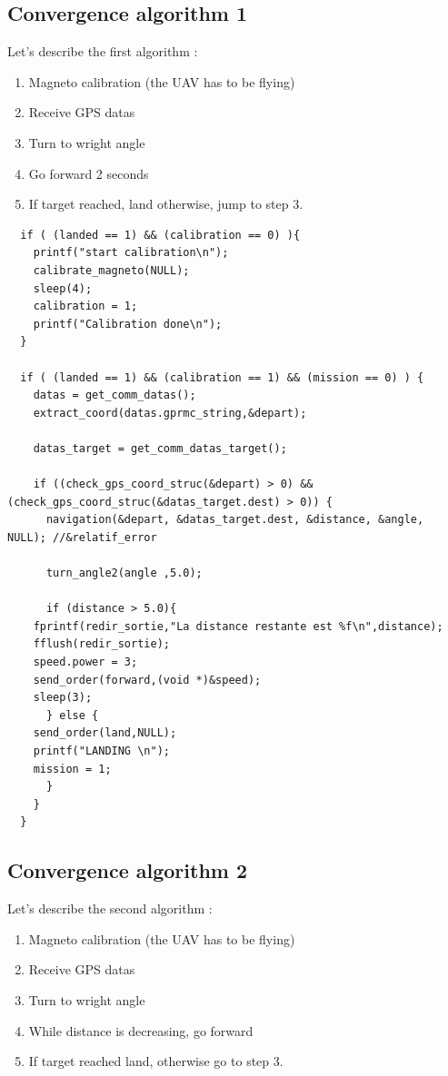 \subsection{Convergence algorithm  1}

Let's describe the first algorithm :\\

\begin{enumerate}

\item  Magneto calibration (the UAV has to be flying)
\item  Receive GPS datas
\item  Turn to wright angle
\item  Go forward 2 seconds
\item  If target reached, land otherwise, jump to step 3.

\end{enumerate}

\begin{lstlisting}
  if ( (landed == 1) && (calibration == 0) ){
    printf("start calibration\n");
    calibrate_magneto(NULL);
    sleep(4);
    calibration = 1;
    printf("Calibration done\n");
  }

  if ( (landed == 1) && (calibration == 1) && (mission == 0) ) {	  
    datas = get_comm_datas();	
    extract_coord(datas.gprmc_string,&depart);
   		
    datas_target = get_comm_datas_target();
   	
    if ((check_gps_coord_struc(&depart) > 0) && (check_gps_coord_struc(&datas_target.dest) > 0)) {
      navigation(&depart, &datas_target.dest, &distance, &angle, NULL); //&relatif_error
	
      turn_angle2(angle ,5.0);
		
      if (distance > 5.0){
	fprintf(redir_sortie,"La distance restante est %f\n",distance);
	fflush(redir_sortie);
	speed.power = 3;
	send_order(forward,(void *)&speed);
	sleep(3);
      } else { 
	send_order(land,NULL); 
	printf("LANDING \n");
	mission = 1;
      }	
    }
  }
\end{lstlisting}


\subsection{Convergence algorithm  2}

Let's describe the second algorithm :\\

\begin{enumerate}

\item  Magneto calibration (the UAV has to be flying)
\item  Receive GPS datas
\item  Turn to wright angle
\item  While distance is decreasing, go forward
\item  If target reached land, otherwise go to step 3.

\end{enumerate}

